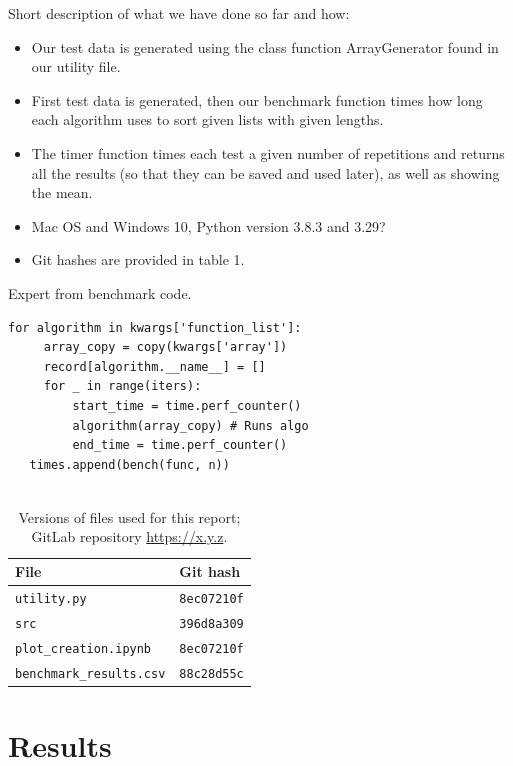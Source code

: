 \documentclass[sigconf, nonacm, natbib, screen, balance=False]{acmart}
\begin{document}
Short description of what we have done so far and how:
\begin{itemize}
\item Our test data is generated using the class function ArrayGenerator found in our utility file.
\item First test data is generated, then our benchmark function times how long each algorithm uses to sort given lists with given lengths.  
\item The timer function times each test a given number of repetitions and returns all the results (so that they can be saved and used later), as well as showing the mean.
\item Mac OS and Windows 10, Python version 3.8.3 and 3.29?
\item Git hashes are provided in table 1.
\end{itemize}

\begin{listing}
  \caption{Expert from benchmark code.}
  \label{lst:bench_setup}
  \begin{lstlisting}
for algorithm in kwargs['function_list']:
     array_copy = copy(kwargs['array'])
     record[algorithm.__name__] = []
     for _ in range(iters):
         start_time = time.perf_counter()
         algorithm(array_copy) # Runs algo
         end_time = time.perf_counter()
   times.append(bench(func, n))
   
  \end{lstlisting}
\end{listing}

\begin{table}
  \caption{Versions of files used for this report; GitLab repository
    \url{https://x.y.z}.}
  \label{tab:hashes}
  \begin{tabular}{ll}
    \hline
    File & Git hash \\\hline
    \verb!utility.py! & \verb!8ec07210f! \\
    \verb!src! & \verb!396d8a309! \\
    \verb!plot_creation.ipynb! & \verb!8ec07210f! \\
    \verb!benchmark_results.csv! & \verb!88c28d55c! \\\hline
  \end{tabular}
\end{table}

\section{Results}\label{sec:results}
\end{document}
